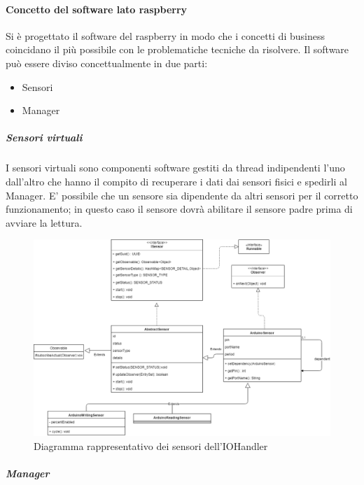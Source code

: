 \documentclass[12pt]{article}
\begin{document}
\paragraph{Concetto del software lato raspberry}
Si è progettato il software del raspberry in modo che i concetti di business coincidano il più possibile con le problematiche tecniche da risolvere.
Il software può essere diviso concettualmente in due parti:
\begin{itemize}
\item Sensori
\item Manager
\end{itemize}
\subparagraph{Sensori virtuali}
I sensori virtuali sono componenti software gestiti da thread indipendenti l'uno dall'altro che hanno il compito di recuperare i dati dai sensori fisici e spedirli al Manager.
E' possibile che un sensore sia dipendente da altri sensori per il corretto funzionamento; in questo caso il sensore dovrà abilitare il sensore padre prima di avviare la lettura.
\begin{figure}[h!]
\centering
	\includegraphics[scale=0.43]{img/parteLocale/SoftwareSensorsRaspberry.png}  
    \caption{Diagramma rappresentativo dei sensori dell'IOHandler}
\end{figure}
\newpage
\subparagraph{Manager}
\end{document}
